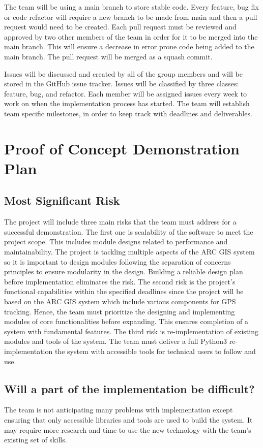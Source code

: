 \documentclass{article}
\begin{document}
The team will be using a main branch to store stable code. Every feature, bug fix or code refactor will require a new branch to be made from main and then a pull request would need to be created. Each pull request must be reviewed and approved by two other members of the team in order for it to be merged into the main branch. This will ensure a decrease in error prone code being added to the main branch. The pull request will be merged as a squash commit.

Issues will be discussed and created by all of the group members and will be stored in the GitHub issue tracker. Issues will be classified by three classes: feature, bug, and refactor. Each member will be assigned issues every week to work on when the implementation process has started. The team will establish team specific milestones, in order to keep track with deadlines and deliverables. 

\section{Proof of Concept Demonstration Plan} %

\subsection{Most Significant Risk}
The project will include three main risks that the team must address for a successful demonstration. The first one is scalability of the software to meet the project scope. This includes module designs related to performance and maintainability. The project is tackling multiple aspects of the ARC GIS system so it is important to design modules following the separation of concerns principles to ensure modularity in the design. Building a reliable design plan before implementation eliminates the risk. The second risk is the project's functional capabilities within the specified deadlines since the project will be based on the ARC GIS system which include various components for GPS tracking. Hence, the team must prioritize the designing and implementing modules of core functionalities before expanding. This ensures completion of a system with fundamental features. The third risk is re-implementation of existing modules and tools of the system. The team must deliver a full Python3 re-implementation the system with accessible tools for technical users to follow and use. 

\subsection{Will a part of the implementation be difficult?}
The team is not anticipating many problems with implementation except ensuring that only accessible libraries and tools are used to build the system. It may require more research and time to use the new technology with the team's existing set of skills. 
\end{document}
